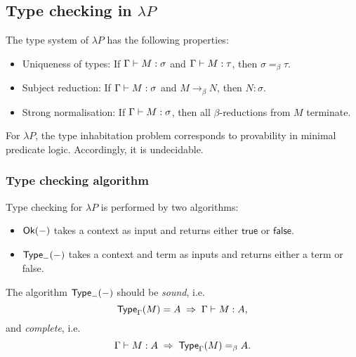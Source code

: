 \subsection{Type checking in $\lambda P$}
The type system of $\lambda P$ has the following properties:
\begin{itemize}
    \item Uniqueness of types:
          If $\Gamma \vdash M : \sigma$ and $\Gamma \vdash M : \tau$,
          then $\sigma =_\beta \tau$.
    \item Subject reduction:
          If $\Gamma \vdash M : \sigma$ and $M \to_\beta N$,
          then $N : \sigma$.
    \item Strong normalisation:
          If $\Gamma \vdash M : \sigma$, then all $\beta$-reductions
          from $M$ terminate.
\end{itemize}

For $\lambda P$, the type inhabitation problem corresponds to
provability in minimal predicate logic.
Accordingly, it is undecidable.


\subsubsection{Type checking algorithm}
Type checking for $\lambda P$ is performed by two algorithms:
\begin{itemize}
    \item $\textsf{Ok}(-)$ takes a context as input and returns
          either $\textsf{true}$ or $\textsf{false}$.
    \item $\textsf{Type}_-(-)$ takes a context and term as inputs
          and returns either a term or \textsf{false}.
\end{itemize}

The algorithm $\textsf{Type}_-(-)$ should be \emph{sound}, i.e.
\[ \textsf{Type}_\Gamma(M) = A \;\Rightarrow\; \Gamma \vdash M : A, \]
and \emph{complete}, i.e.
\[ \Gamma \vdash M : A \;\Rightarrow\; \textsf{Type}_\Gamma(M) =_\beta A .\]

